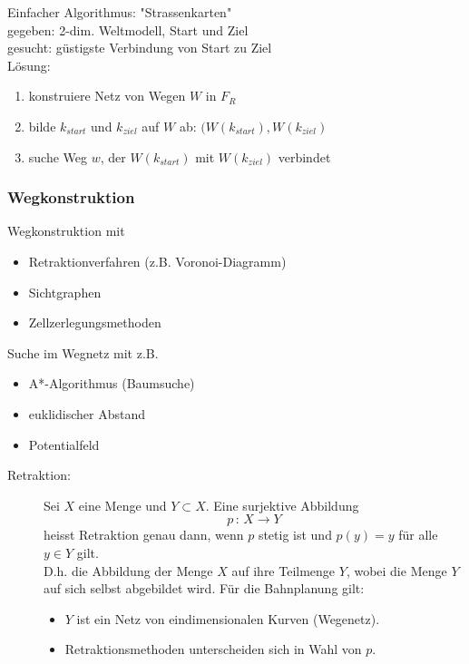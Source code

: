 Einfacher Algorithmus: "{}Strassenkarten"{} \\
gegeben: 2-dim. Weltmodell, Start und Ziel \\
gesucht: güstigste Verbindung von Start zu Ziel \\
Lösung:
\begin{enumerate}
\item konstruiere Netz von Wegen $W$ in $F_R$
\item bilde $k_{start}$ und $k_{ziel}$ auf $W$ ab: $(W(k_{start}), W(k_{ziel})$
\item suche Weg $w$, der $W(k_{start})$ mit $W(k_{ziel})$ verbindet
\end{enumerate}

\subsubsection*{Wegkonstruktion}

Wegkonstruktion mit
\begin{itemize}
\item Retraktionverfahren (z.B. Voronoi-Diagramm)
\item Sichtgraphen
\item Zellzerlegungsmethoden
\end{itemize}
Suche im Wegnetz mit z.B.
\begin{itemize}
\item A*-Algorithmus (Baumsuche)
\item euklidischer Abstand
\item Potentialfeld
\end{itemize}

\begin{description}
\item[Retraktion:] Sei $X$ eine Menge und $Y \subset X$. Eine surjektive Abbildung $$p \, : \, X \to Y$$ heisst Retraktion genau dann, wenn $p$ stetig ist und $p(y) = y$ für alle $y \in Y$ gilt. \\
D.h. die Abbildung der Menge $X$ auf ihre Teilmenge $Y$, wobei die Menge $Y$ auf sich selbst abgebildet wird. Für die Bahnplanung gilt:
\begin{itemize}
\item $Y$ ist ein Netz von eindimensionalen Kurven (Wegenetz).
\item Retraktionsmethoden unterscheiden sich in Wahl von $p$.
\end{itemize}
\end{description}

